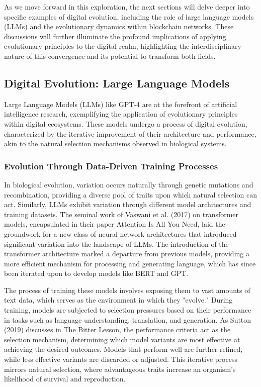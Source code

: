 \documentclass[12pt,twoside]{article}
\begin{document}
As we move forward in this exploration, the next sections will delve deeper into specific examples of digital evolution, including the role of large language models (LLMs) and the evolutionary dynamics within blockchain networks. These discussions will further illuminate the profound implications of applying evolutionary principles to the digital realm, highlighting the interdisciplinary nature of this convergence and its potential to transform both fields.

\subsection{Digital Evolution: Large Language Models}

Large Language Models (LLMs) like GPT-4 are at the forefront of artificial intelligence research, exemplifying the application of evolutionary principles within digital ecosystems. These models undergo a process of digital evolution, characterized by the iterative improvement of their architecture and performance, akin to the natural selection mechanisms observed in biological systems.

\subsubsection{Evolution Through Data-Driven Training Processes}

In biological evolution, variation occurs naturally through genetic mutations and recombination, providing a diverse pool of traits upon which natural selection can act. Similarly, LLMs exhibit variation through different model architectures and training datasets. The seminal work of Vaswani et al. (2017) on transformer models, encapsulated in their paper Attention Is All You Need, laid the groundwork for a new class of neural network architectures that introduced significant variation into the landscape of LLMs. The introduction of the transformer architecture marked a departure from previous models, providing a more efficient mechanism for processing and generating language, which has since been iterated upon to develop models like BERT and GPT.

The process of training these models involves exposing them to vast amounts of text data, which serves as the environment in which they "evolve." During training, models are subjected to selection pressures based on their performance in tasks such as language understanding, translation, and generation. As Sutton (2019) discusses in The Bitter Lesson, the performance criteria act as the selection mechanism, determining which model variants are most effective at achieving the desired outcomes. Models that perform well are further refined, while less effective variants are discarded or adjusted. This iterative process mirrors natural selection, where advantageous traits increase an organism's likelihood of survival and reproduction.
\end{document}

